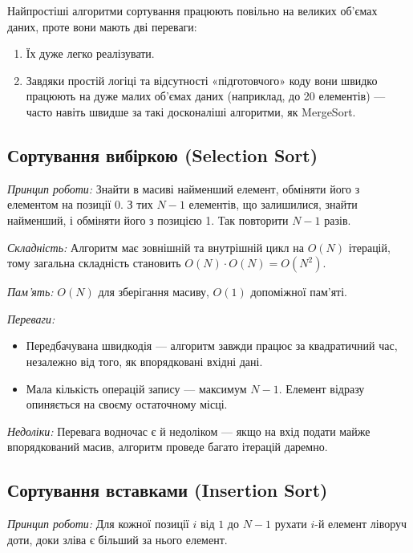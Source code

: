 \documentclass[12pt,a4paper]{report}
\begin{document}
Найпростіші алгоритми сортування працюють повільно на великих об’ємах даних, проте вони мають дві переваги:

\begin{enumerate}
    \item Їх дуже легко реалізувати.
    \item Завдяки простій логіці та відсутності «підготовчого» коду вони швидко працюють на дуже малих об’ємах даних (наприклад, до 20 елементів) --- часто навіть швидше за такі досконаліші алгоритми, як MergeSort.
\end{enumerate}


\subsection{Сортування вибіркою (Selection Sort)}

\emph{Принцип роботи:} Знайти в масиві найменший елемент, обміняти його з елементом на позиції 0. З тих \(N-1\) елементів, що залишилися, знайти найменший, і обміняти його з позицією 1. Так повторити \(N - 1\) разів.

\begin{minipage}{\linewidth}

\end{minipage}

\emph{Складність:} Алгоритм має зовнішній та внутрішній цикл на \(O(N)\) ітерацій, тому загальна складність становить \(O(N) \cdot O(N) = O(N^2)\).

\emph{Пам’ять:} \(O(N)\) для зберігання масиву, \(O(1)\) допоміжної пам’яті.

\emph{Переваги:}
\begin{itemize}
    \item Передбачувана швидкодія --- алгоритм завжди працює за квадратичний час, незалежно від того, як впорядковані вхідні дані.
    \item Мала кількість операцій запису --- максимум \(N-1\). Елемент відразу опиняється на своєму остаточному місці.
\end{itemize}

\emph{Недоліки:} Перевага водночас є й недоліком --- якщо на вхід подати майже впорядкований масив, алгоритм проведе багато ітерацій даремно.


\subsection{Сортування вставками (Insertion Sort)}

\emph{Принцип роботи:} Для кожної позиції \(i\) від \(1\) до \(N - 1\) рухати \(i\)-й елемент ліворуч доти, доки зліва є більший за нього елемент.
\end{document}
